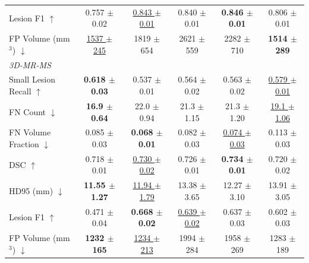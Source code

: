 \begin{table}[t]
{\begin{tabular}{lccccc}
Lesion F1 $\uparrow$
& 0.757 $\pm$ 0.02
& \underline{0.843 $\pm$ 0.01}
& 0.840 $\pm$ 0.01
& \textbf{0.846 $\pm$ 0.01}
& 0.806 $\pm$ 0.01 \\
FP Volume (mm$^3$) $\downarrow$
& \underline{1537 $\pm$ 245}
& 1819 $\pm$ 654
& 2621 $\pm$ 559
& 2282 $\pm$ 710
& \textbf{1514 $\pm$ 289} \\
\midrule
\multicolumn{6}{l}{\emph{3D-MR-MS}} \\
Small Lesion Recall $\uparrow$
& \textbf{0.618 $\pm$ 0.03}
& 0.537 $\pm$ 0.01
& 0.564 $\pm$ 0.02
& 0.563 $\pm$ 0.02
& \underline{0.579 $\pm$ 0.01} \\
FN Count $\downarrow$
& \textbf{16.9 $\pm$ 0.64}
& 22.0 $\pm$ 0.94
& 21.3 $\pm$ 1.15
& 21.3 $\pm$ 1.20
& \underline{19.1 $\pm$ 1.06} \\
FN Volume Fraction $\downarrow$
& 0.085 $\pm$ 0.03
& \textbf{0.068 $\pm$ 0.01}
& 0.082 $\pm$ 0.03
& \underline{0.074 $\pm$ 0.03}
& 0.113 $\pm$ 0.03 \\
DSC $\uparrow$
& 0.718 $\pm$ 0.01
& \underline{0.730 $\pm$ 0.02}
& 0.726 $\pm$ 0.01
& \textbf{0.734 $\pm$ 0.01}
& 0.720 $\pm$ 0.02 \\
HD95 (mm) $\downarrow$
& \textbf{11.55 $\pm$ 1.27}
& \underline{11.94 $\pm$ 1.79}
& 13.38 $\pm$ 3.65
& 12.27 $\pm$ 3.10
& 13.91 $\pm$ 3.05 \\
Lesion F1 $\uparrow$
& 0.471 $\pm$ 0.04
& \textbf{0.668 $\pm$ 0.02}
& \underline{0.639 $\pm$ 0.02}
& 0.637 $\pm$ 0.03
& 0.602 $\pm$ 0.03 \\
FP Volume (mm$^3$) $\downarrow$
& \textbf{1232 $\pm$ 165}
& \underline{1234 $\pm$ 213}
& 1994 $\pm$ 284
& 1958 $\pm$ 269
& 1283 $\pm$ 189 \\
\bottomrule
\end{tabular}%
}
\end{table}

